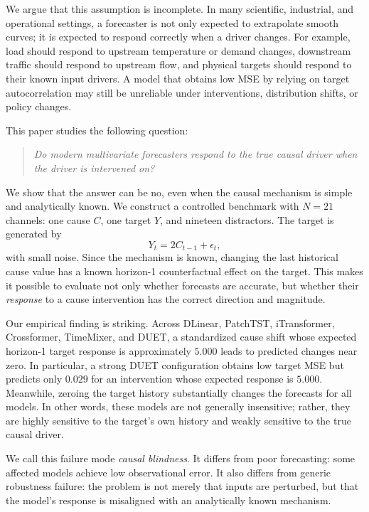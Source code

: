 \documentclass{article}
\begin{document}
We argue that this assumption is incomplete. In many scientific, industrial, and
operational settings, a forecaster is not only expected to extrapolate smooth curves;
it is expected to respond correctly when a driver changes. For example, load should
respond to upstream temperature or demand changes, downstream traffic should respond
to upstream flow, and physical targets should respond to their known input drivers.
A model that obtains low MSE by relying on target autocorrelation may still be
unreliable under interventions, distribution shifts, or policy changes.

This paper studies the following question:

\begin{quote}
\emph{Do modern multivariate forecasters respond to the true causal driver when the
driver is intervened on?}
\end{quote}

We show that the answer can be no, even when the causal mechanism is simple and
analytically known. We construct a controlled benchmark with $N=21$ channels: one
cause $C$, one target $Y$, and nineteen distractors. The target is generated by
\begin{equation}
Y_t = 2 C_{t-1} + \epsilon_t,
\label{eq:structural}
\end{equation}
with small noise. Since the mechanism is known, changing the last historical cause
value has a known horizon-1 counterfactual effect on the target. This makes it
possible to evaluate not only whether forecasts are accurate, but whether their
\emph{response} to a cause intervention has the correct direction and magnitude.

Our empirical finding is striking. Across DLinear, PatchTST, iTransformer,
Crossformer, TimeMixer, and DUET, a standardized cause shift whose expected
horizon-1 target response is approximately $5.000$ leads to predicted changes near
zero. In particular, a strong DUET configuration obtains low target MSE but predicts
only $0.029$ for an intervention whose expected response is $5.000$. Meanwhile,
zeroing the target history substantially changes the forecasts for all models. In
other words, these models are not generally insensitive; rather, they are highly
sensitive to the target's own history and weakly sensitive to the true causal driver.

We call this failure mode \emph{causal blindness}. It differs from poor forecasting:
some affected models achieve low observational error. It also differs from generic
robustness failure: the problem is not merely that inputs are perturbed, but that
the model's response is misaligned with an analytically known mechanism.
\end{document}
